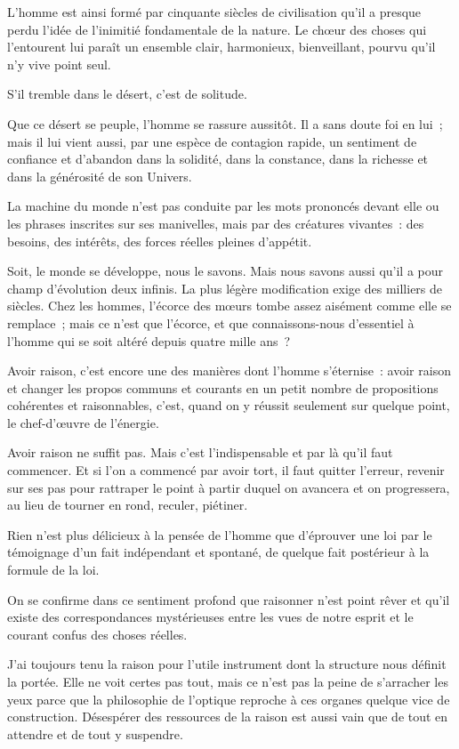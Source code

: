 \documentclass[french,twoside]{book} %
\newcommand{\astermono}{\medskip\centerline{\color{rubric}\large\selectfont{\syms ✻}}\medskip\par}%
\begin{document}
\astermono

\noindent L’homme est ainsi formé par cinquante siècles de civilisation qu’il a presque perdu l’idée de l’inimitié fondamentale de la nature. Le chœur des choses qui l’entourent lui paraît un ensemble clair, harmonieux, bienveillant, pourvu qu’il n’y vive point seul.\par
S’il tremble dans le désert, c’est de solitude.\par
Que ce désert se peuple, l’homme se rassure aussitôt. Il a sans doute foi en lui ; mais il lui vient aussi, par une espèce de contagion rapide, un sentiment de confiance et d’abandon dans la solidité, dans la constance, dans la richesse et dans la générosité de son Univers.\par
La machine du monde n’est pas conduite par les mots prononcés devant elle ou les phrases inscrites sur ses manivelles, mais par des créatures vivantes : des besoins, des intérêts, des forces réelles pleines d’appétit.\par

\astermono

\noindent Soit, le monde se développe, nous le savons. Mais nous savons aussi qu’il a pour champ d’évolution deux infinis. La plus légère modification exige des milliers de siècles. Chez les hommes, l’écorce des mœurs tombe assez aisément comme elle se remplace ; mais ce n’est que l’écorce, et que connaissons-nous d’essentiel à l’homme qui se soit altéré depuis quatre mille ans ?\par

\astermono

\noindent Avoir raison, c’est encore une des manières dont l’homme s’éternise : avoir raison et changer les propos communs et courants en un petit nombre de propositions cohérentes et raisonnables, c’est, quand on y réussit seulement sur quelque point, le chef-d’œuvre de l’énergie.\par
Avoir raison ne suffit pas. Mais c’est l’indispensable et par là qu’il faut commencer. Et si l’on a commencé par avoir tort, il faut quitter l’erreur, revenir sur ses pas pour rattraper le point à partir duquel on avancera et on progressera, au lieu de tourner en rond, reculer, piétiner.\par

\astermono

\noindent Rien n’est plus délicieux à la pensée de l’homme que d’éprouver une loi par le témoignage d’un fait indépendant et spontané, de quelque fait postérieur à la formule de la loi.\par
On se confirme dans ce sentiment profond que raisonner n’est point rêver et qu’il existe des correspondances mystérieuses entre les vues de notre esprit et le courant confus des choses réelles.\par
J’ai toujours tenu la raison pour l’utile instrument dont la structure nous définit la portée. Elle ne voit certes pas tout, mais ce n’est pas la peine de s’arracher les yeux parce que la philosophie de l’optique reproche à ces organes quelque vice de construction. Désespérer des ressources de la raison est aussi vain que de tout en attendre et de tout y suspendre.\par
\end{document}
